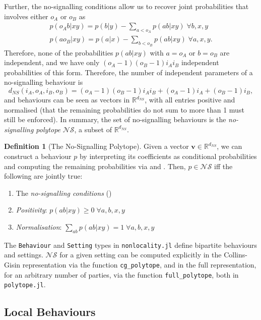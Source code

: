 \documentclass[10pt, a4paper]{article}
\numberwithin{equation}{section} %
\newcounter{stmt} %
\theoremstyle{definition}
\newtheorem{defn}[stmt]{Definition}
\theoremstyle{plain}
\newcommand{\?}{\mathrel{?}} %
\newcommand{\R}{\mathbb{R}} %
\newcommand{\cvec}[1]{\boldsymbol{\mathbf{#1}}}    %
\newcommand{\NSs}{\mathcal{NS}}
\begin{document}
    Further, the no-signalling conditions allow us to recover joint probabilities that involves either \(o_A\) or \(o_B\) as
    \begin{gather}
      p(o_A b|xy) = p(b|y) - \sum_{a < o_A} p(ab|xy)\;\forall b,x,y\label{eqn:cgtofullA} \\
      p(ao_B|xy) = p(a|x) - \sum_{b < o_B} p(ab|xy)\;\forall a,x,y.\label{eqn:cgtofullB}
    \end{gather}
    Therefore, none of the probabilities \(p(ab|xy)\) with \(a = o_A\) or \(b = o_B\) are independent, and we have only \((o_A-1)(o_B-1){i_A}{i_B}\) independent probabilities of this form. Therefore, the number of independent parameters of a no-signalling behaviour is
    \[ d_{NS}(i_A, o_A, i_B, o_B) = (o_A-1)(o_B-1){i_A}{i_B} + (o_A-1)i_A + (o_B-1)i_B, \]
    and behaviours can be seen as vectors in \(\R^{d_{NS}}\), with all entries positive and normalised (that the remaining probabilities do not sum to more than 1 must still be enforced). In summary, the set of no-signalling behaviours is the \emph{no-signalling polytope} \(\NSs\), a subset of \(\R^{d_{NS}}\).
    \begin{defn}[The No-Signalling Polytope]
      Given a vector \(\cvec{v} \in \R^{d_{NS}}\), we can construct a behaviour \(p\) by interpreting its coefficients as conditional probabilities and computing the remaining probabilities via  and . Then, \(p \in \NSs\) iff the following are jointly true:
      \begin{enumerate}
        \item The \emph{no-signalling conditions} ()
        \item \emph{Positivity}: \(p(ab|xy) \geq 0\;\forall a,b,x,y\) 
        \item \emph{Normalisation}: \(\sum_{ab} p(ab|xy) = 1\;\forall a,b,x,y\)
      \end{enumerate}
    \end{defn}

    The \verb`Behaviour` and \verb`Setting` types in \verb`nonlocality.jl` define bipartite behaviours and settings. \(\NSs\) for a given setting can be computed explicitly in the Collins-Gisin representation via the function \verb`cg_polytope`, and in the full representation, for an arbitrary number of parties, via the function \verb`full_polytope`, both in \verb`polytope.jl`.

    \subsection{Local Behaviours}
\end{document}
